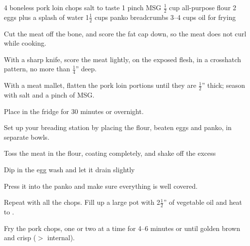 \dishtype{}
\begin{ingreds}
    4 boneless pork loin chops
    salt to taste
    1 pinch MSG
    $\frac{1}{2}$ cup all-purpose flour
    2 eggs plus a splash of water
    1$\frac{1}{2}$ cups panko breadcrumbs
    3--4 cups oil for frying
\end{ingreds}
\begin{method}
    Cut the meat off the bone, and score the fat cap down, so the meat does not curl while cooking.\par
    With a sharp knife, score the meat lightly, on the exposed flesh, in a crosshatch pattern, no more than $\frac{1}{4}$'' deep.\par
	With a meat mallet, flatten the pork loin portions until they are $\frac{1}{2}$'' thick; season with salt and a pinch of MSG.\@\par
    Place in the fridge for 30 minutes or overnight.\par
	Set up your breading station by placing the flour, beaten eggs and panko, in separate bowls.\par
    Toss the meat in the flour, coating completely, and shake off the excess\par
    Dip in the egg wash and let it drain slightly\par
    Press it into the panko and make sure everything is well covered.\par
    Repeat with all the chops.
	Fill up a large pot with 2$\frac{1}{2}$'' of vegetable oil and heat to .\par
    Fry the pork chops, one or two at a time for 4--6 minutes or until golden brown and crisp ($>$ internal).
\end{method}